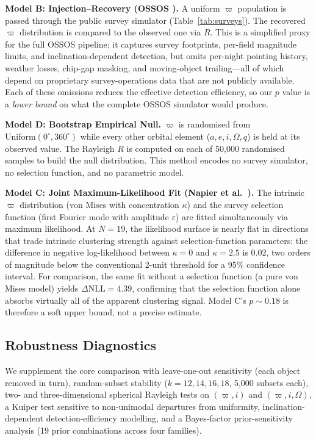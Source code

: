 \documentclass[12pt,a4paper]{article}
\begin{document}
\textbf{Model B: Injection--Recovery (OSSOS \cite{shankman2017}).} A uniform $\varpi$ population is passed through the public survey simulator (Table~\ref{tab:surveys}). The recovered $\varpi$ distribution is compared to the observed one via $R$. This is a simplified proxy for the full OSSOS pipeline; it captures survey footprints, per-field magnitude limits, and inclination-dependent detection, but omits per-night pointing history, weather losses, chip-gap masking, and moving-object trailing---all of which depend on proprietary survey-operations data that are not publicly available. Each of these omissions reduces the effective detection efficiency, so our $p$ value is a \textit{lower bound} on what the complete OSSOS simulator would produce.

\textbf{Model D: Bootstrap Empirical Null.} $\varpi$ is randomised from $\mathrm{Uniform}(0^\circ, 360^\circ)$ while every other orbital element ($a, e, i, \Omega, q$) is held at its observed value. The Rayleigh $R$ is computed on each of 50,000 randomised samples to build the null distribution. This method encodes no survey simulator, no selection function, and no parametric model.

\textbf{Model C: Joint Maximum-Likelihood Fit (Napier et al.\ \cite{napier2021}).} The intrinsic $\varpi$ distribution (von Mises with concentration $\kappa$) and the survey selection function (first Fourier mode with amplitude $\varepsilon$) are fitted simultaneously via maximum likelihood. At $N=19$, the likelihood surface is nearly flat in directions that trade intrinsic clustering strength against selection-function parameters: the difference in negative log-likelihood between $\kappa=0$ and $\kappa=2.5$ is $0.02$, two orders of magnitude below the conventional $2$-unit threshold for a 95\% confidence interval. For comparison, the same fit without a selection function (a pure von Mises model) yields $\Delta\mathrm{NLL}=4.39$, confirming that the selection function alone absorbs virtually all of the apparent clustering signal. Model C's $p\sim0.18$ is therefore a soft upper bound, not a precise estimate.

\subsection{Robustness Diagnostics}

We supplement the core comparison with leave-one-out sensitivity (each object removed in turn), random-subset stability ($k=12,14,16,18$, 5,000 subsets each), two- and three-dimensional spherical Rayleigh tests on $(\varpi, i)$ and $(\varpi, i, \Omega)$, a Kuiper test sensitive to non-unimodal departures from uniformity, inclination-dependent detection-efficiency modelling, and a Bayes-factor prior-sensitivity analysis (19 prior combinations across four families).
\end{document}
